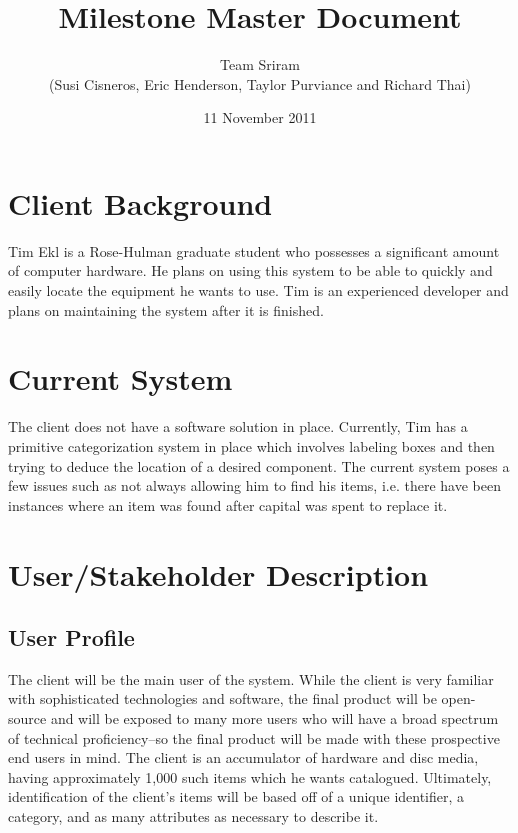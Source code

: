 \documentclass{article}
\begin{document}
\setlength{\voffset}{3.5in}
\title{Milestone Master Document}
\author{Team Sriram\\
(Susi Cisneros, Eric Henderson, Taylor Purviance and Richard Thai)}
\date{11 November 2011}
\maketitle
\clearpage
\setlength{\voffset}{0pt}
\tableofcontents
\clearpage
\section{Client Background}
Tim Ekl is a Rose-Hulman graduate student who possesses a significant amount of computer hardware.  He plans on using this system to be able to quickly and easily locate the equipment he wants to use.  Tim is an experienced developer and plans on maintaining the system after it is finished.

\section{Current System}
The client does not have a software solution in place.  Currently, Tim has a primitive categorization system in place which involves labeling boxes and then trying to deduce the location of a desired component.  The current system poses a few issues such as not always allowing him to find his items, i.e. there have been instances where an item was found after capital was spent to replace it.

\section{User/Stakeholder Description}

\subsection{User Profile}
The client will be the main user of the system. While the client is very familiar with sophisticated technologies and software, the final product will be open-source and will be exposed to many more users who will have a broad spectrum of technical proficiency--so the final product will be made with these prospective end users in mind. The client is an accumulator of hardware and disc media, having approximately 1,000 such items which he wants catalogued. Ultimately, identification of the client's items will be based off of a unique identifier, a category, and as many attributes as necessary to describe it.
\end{document}
